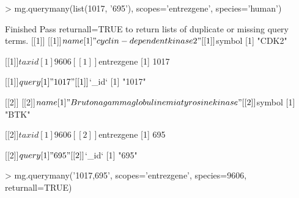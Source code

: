 \documentclass[12pt]{article}
\begin{document}
\begin{Schunk}
\begin{Sinput}
> mg.querymany(list(1017, '695'), scopes='entrezgene', species='human')
\end{Sinput}
\begin{Soutput}
Finished
Pass returnall=TRUE to return lists of duplicate or missing query terms.
[[1]]
[[1]]$name
[1] "cyclin-dependent kinase 2"

[[1]]$symbol
[1] "CDK2"

[[1]]$taxid
[1] 9606

[[1]]$entrezgene
[1] 1017

[[1]]$query
[1] "1017"

[[1]]$`_id`
[1] "1017"


[[2]]
[[2]]$name
[1] "Bruton agammaglobulinemia tyrosine kinase"

[[2]]$symbol
[1] "BTK"

[[2]]$taxid
[1] 9606

[[2]]$entrezgene
[1] 695

[[2]]$query
[1] "695"

[[2]]$`_id`
[1] "695"
\end{Soutput}
\end{Schunk}




\begin{Schunk}
\begin{Sinput}
> mg.querymany('1017,695', scopes='entrezgene', species=9606, returnall=TRUE)
\end{Sinput}
\end{Schunk}
\end{document}
